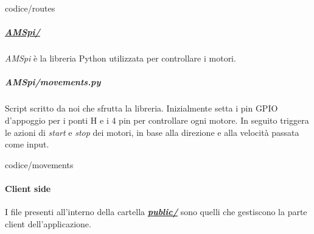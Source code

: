 \documentclass[11pt]{article}
\begin{document}
\begin{lstinputlisting}[caption={routes.js},basicstyle=\tiny]{codice/routes}
\end{lstinputlisting}
\subparagraph{\underline{AMSpi/}}
\textit{AMSpi} è la libreria Python utilizzata per controllare i motori. 
\subparagraph{AMSpi/movements.py}
Script scritto da noi che sfrutta la libreria. Inizialmente setta i pin GPIO d'appoggio per i ponti H e i 4 pin per controllare ogni motore. In seguito triggera le azioni di \textit{start} e \textit{stop} dei motori, in base alla direzione e alla velocità passata come input.
\begin{lstinputlisting}[caption={AMSpy/movements.py},basicstyle=\tiny]{codice/movements}
\end{lstinputlisting}
\paragraph{Client side}
I file presenti all'interno della cartella \underline{\textbf{\textit{public/}}} sono quelli che gestiscono la parte client dell'applicazione.\\
\end{document}
